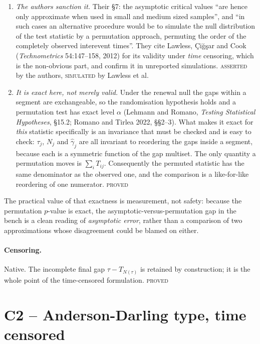 \documentclass[11pt,a4paper]{article}
\newcommand{\gh}{\hat\gamma}
\newcommand{\Ntau}{N(\tau)}
\newcommand{\PROVED}{\textsc{\textcolor{blue!55!black}{proved}}}
\newcommand{\SIMULATED}{\textsc{\textcolor{orange!70!black}{simulated}}}
\newcommand{\ASSERTED}{\textsc{\textcolor{purple!70!black}{asserted}}}
\begin{document}
\begin{enumerate}[leftmargin=1.6em,itemsep=2pt]
\item \emph{The authors sanction it.} Their \S 7: the asymptotic critical values
\enquote{are hence only approximate when used in small and medium sized samples}, and
\enquote{in such cases an alternative procedure would be to simulate the null
distribution of the test statistic by a permutation approach, permuting the order of the
completely observed interevent times}. They cite Lawless, Çiğşar and Cook
(\emph{Technometrics} 54:147--158, 2012) for its validity under \emph{time} censoring,
which is the non-obvious part, and confirm it in unreported simulations.
\ASSERTED{} by the authors, \SIMULATED{} by Lawless et al.
\item \emph{It is exact here, not merely valid.} Under the renewal null the gaps within a
segment are exchangeable, so the randomisation hypothesis holds and a permutation test
has exact level $\alpha$ (Lehmann and Romano, \emph{Testing Statistical Hypotheses},
\S 15.2; Romano and Tirlea 2022, \S\S 2--3). What makes it exact for \emph{this}
statistic specifically is an invariance that must be checked and is easy to check:
$\tau_j$, $N_j$ and $\gh_j$ are all invariant to reordering the gaps inside a segment,
because each is a symmetric function of the gap multiset. The only quantity a permutation
moves is $\sum_i T_{ij}$. Consequently the permuted statistic has the same denominator as
the observed one, and the comparison is a like-for-like reordering of one numerator.
\PROVED
\end{enumerate}

\noindent
The practical value of that exactness is measurement, not safety: because the permutation
$p$-value is exact, the asymptotic-versus-permutation gap in the bench is a clean reading
of \emph{asymptotic error}, rather than a comparison of two approximations whose
disagreement could be blamed on either.

\paragraph{Censoring.} Native. The incomplete final gap $\tau - T_{\Ntau}$ is retained
by construction; it is the whole point of the time-censored formulation. \PROVED

\section{C2 -- Anderson-Darling type, time censored}
\end{document}
